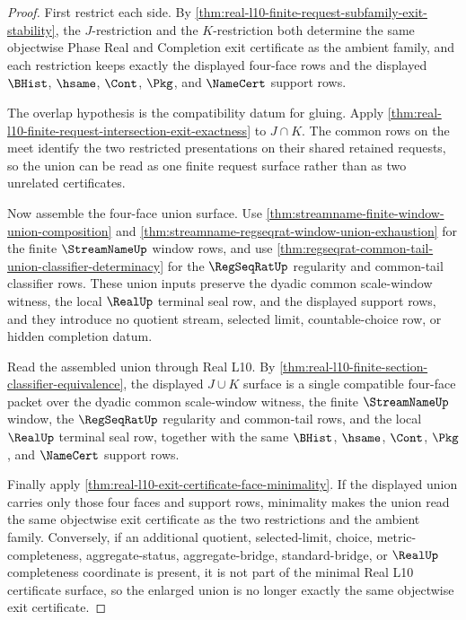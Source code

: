 \begin{proof}
First restrict each side. By \autoref{thm:real-l10-finite-request-subfamily-exit-stability}, the $J$-restriction and the $K$-restriction both determine the same objectwise Phase Real and Completion exit certificate as the ambient family, and each restriction keeps exactly the displayed four-face rows and the displayed $\BHist$, $\hsame$, $\Cont$, $\Pkg$, and $\NameCert$ support rows.

The overlap hypothesis is the compatibility datum for gluing. Apply \autoref{thm:real-l10-finite-request-intersection-exit-exactness} to $J \cap K$. The common rows on the meet identify the two restricted presentations on their shared retained requests, so the union can be read as one finite request surface rather than as two unrelated certificates.

Now assemble the four-face union surface. Use \autoref{thm:streamname-finite-window-union-composition} and \autoref{thm:streamname-regseqrat-window-union-exhaustion} for the finite $\StreamNameUp$ window rows, and use \autoref{thm:regseqrat-common-tail-union-classifier-determinacy} for the $\RegSeqRatUp$ regularity and common-tail classifier rows. These union inputs preserve the dyadic common scale-window witness, the local $\RealUp$ terminal seal row, and the displayed support rows, and they introduce no quotient stream, selected limit, countable-choice row, or hidden completion datum.

Read the assembled union through Real L10. By \autoref{thm:real-l10-finite-section-classifier-equivalence}, the displayed $J \cup K$ surface is a single compatible four-face packet over the dyadic common scale-window witness, the finite $\StreamNameUp$ window, the $\RegSeqRatUp$ regularity and common-tail rows, and the local $\RealUp$ terminal seal row, together with the same $\BHist$, $\hsame$, $\Cont$, $\Pkg$, and $\NameCert$ support rows.

Finally apply \autoref{thm:real-l10-exit-certificate-face-minimality}. If the displayed union carries only those four faces and support rows, minimality makes the union read the same objectwise exit certificate as the two restrictions and the ambient family. Conversely, if an additional quotient, selected-limit, choice, metric-completeness, aggregate-status, aggregate-bridge, standard-bridge, or $\RealUp$ completeness coordinate is present, it is not part of the minimal Real L10 certificate surface, so the enlarged union is no longer exactly the same objectwise exit certificate.
\end{proof}

